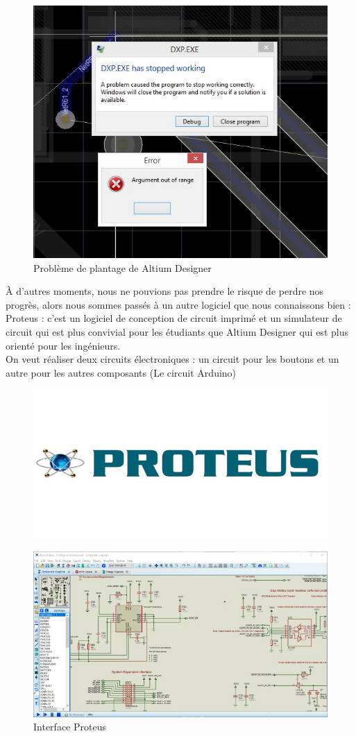 \vspace{1cm}

\begin{figure}[!htbp]
    \centering
    \includegraphics[width=.5\textwidth]{assets/conception1/img23.jpg}
    \caption{Problème de plantage de Altium Designer}
\end{figure}

\FloatBarrier

À d’autres moments, nous ne pouvions pas prendre le risque de perdre nos progrès, alors nous sommes passés à un autre logiciel que nous connaissons bien : Proteus : c’est un logiciel de conception de circuit imprimé et un simulateur de circuit qui est plus convivial pour les étudiants que Altium Designer qui est plus orienté pour les ingénieurs.  \\
On veut réaliser deux circuits électroniques : un circuit pour les boutons et un autre pour les autres composants (Le circuit Arduino)

\begin{figure}[!htbp]
    \centering
    \includegraphics[width=.4\textwidth]{assets/conception1/img24.jpg}
\end{figure}

\begin{figure}[!htbp]
    \centering
    \includegraphics[width=.7\textwidth]{assets/conception1/schematicLrg.jpg}
    \caption{Interface Proteus}
\end{figure}

